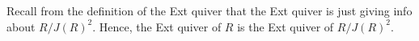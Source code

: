 Recall from the definition of the Ext quiver that the Ext quiver is just giving info
about $R/J(R)^2$. Hence, the Ext quiver of $R$ is the Ext quiver of $R/J(R)^2$.
